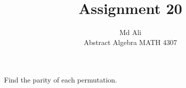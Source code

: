 \documentclass[12pt]{article}
\newenvironment{problem}[2][Problem]{\begin{trivlist}
\item[\hskip \labelsep {\bfseries #1}\hskip \labelsep {\bfseries #2.}]}{\end{trivlist}}
\begin{document}
 
 
\title{Assignment 20}%
\author{Md Ali\\ %
Abstract Algebra MATH 4307} %
 
\maketitle
 
\begin{problem}{3.3.1} %
Find the parity of each permutation.
\end{problem}
 
\end{document}
